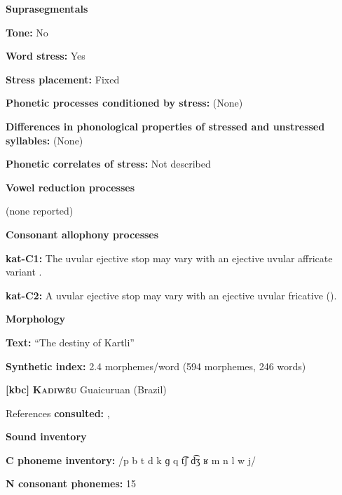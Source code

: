 \textbf{Suprasegmentals}



\textbf{Tone:} No



\textbf{Word stress:} Yes



\textbf{Stress placement:} Fixed



\textbf{Phonetic processes conditioned by stress:} (None)



\textbf{Differences in phonological properties of stressed and unstressed syllables:} (None)



\textbf{Phonetic correlates of stress:} Not described



\textbf{Vowel reduction processes}



(none reported)



\textbf{Consonant allophony processes}



\textbf{kat-C1:} The uvular ejective stop may vary with an ejective uvular affricate variant \citep{Aronson1991}.



\textbf{kat-C2:} A uvular ejective stop may vary with an ejective uvular fricative (\citealt{ShostedChikovani2006}).



\textbf{Morphology}



\textbf{Text:} “The destiny of Kartli” \citep[655-663]{Hewitt1995}



\textbf{Synthetic index:} 2.4 morphemes/word (594 morphemes, 246 words)



\textbf{[kbc]}   \textbf{\textsc{Kadiwéu}}  Guaicuruan (Brazil)



References \textbf{consulted:} \citet{Braggio1981}, \citet{Sandalo1997}



\textbf{Sound inventory}



\textbf{C phoneme inventory:} /p b t d k ɡ q t͡ʃ d͡ʒ ʁ m n l w j/



\textbf{N consonant phonemes:} 15



